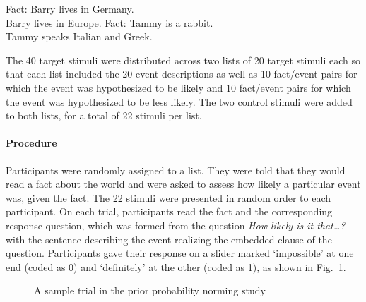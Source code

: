 \documentclass[11pt,fleqn]{article}
\newcommand{\6}{\mbox{$[\hspace*{-.6mm}[$}}
\newcommand{\9}{\mbox{$]\hspace*{-.6mm}]$}}
\newcommand{\figref}[1]{Fig.~\ref{#1}}
\begin{document}
\begin{exe}
\ex\label{control1}
\begin{xlist}
\ex Fact: Barry lives in Germany.
\\ Barry lives in Europe.
\ex Fact: Tammy is a rabbit.
\\ Tammy speaks Italian and Greek.
\end{xlist}
\end{exe}

The 40 target stimuli were distributed across two lists of 20 target stimuli each so that each list included the 20 event descriptions as well as 10 fact/event pairs for which the event was hypothesized to be likely and 10 fact/event pairs for which the event was hypothesized to be less likely. The two control stimuli were added to both lists, for a total of 22 stimuli per list. 

\paragraph{Procedure} Participants were randomly assigned to a list. They were told that they would read a fact about the world and were asked to assess how likely a particular event was, given the fact. The 22 stimuli were presented in random order to each participant. On each trial, participants read the fact and the corresponding response question, which was formed from the question {\em How likely is it that\ldots ?} with the sentence describing the event realizing the embedded clause of the question. Participants gave their response on a slider marked `impossible' at one end (coded as 0) and `definitely' at the other (coded as 1), as shown in \figref{f-trial-exp1}. 

\begin{figure}[h!]
\begin{center}
\end{center}
\caption{A sample trial in the prior probability norming study}\label{f-trial-exp1}
\end{figure}
\end{document}
